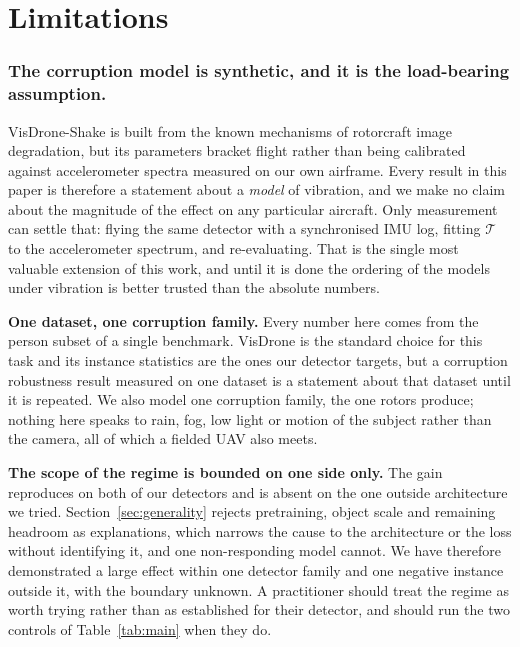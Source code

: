 \section{Limitations}
\label{sec:limitations}

\subsubsection{The corruption model is synthetic, and it is the load-bearing assumption.}
VisDrone-Shake is built from the known mechanisms of rotorcraft image degradation,
but its parameters bracket flight rather than being calibrated against accelerometer
spectra measured on our own airframe. Every result in this paper is therefore a
statement about a \emph{model} of vibration, and we make no claim about the
magnitude of the effect on any particular aircraft. Only measurement can settle
that: flying the same detector with a synchronised IMU log, fitting $\mathcal{T}$
to the accelerometer spectrum, and re-evaluating. That is the single most valuable
extension of this work, and until it is done the ordering of the models under
vibration is better trusted than the absolute numbers.

\medskip\noindent\textbf{One dataset, one corruption family.}
Every number here comes from the person subset of a single benchmark. VisDrone is
the standard choice for this task and its instance statistics are the ones our
detector targets, but a corruption robustness result measured on one dataset is a
statement about that dataset until it is repeated. We also model one corruption
family, the one rotors produce; nothing here speaks to rain, fog, low light or
motion of the subject rather than the camera, all of which a fielded UAV also meets.

\medskip\noindent\textbf{The scope of the regime is bounded on one side only.}
The gain reproduces on both of our detectors and is absent on the one outside
architecture we tried. Section~\ref{sec:generality} rejects pretraining, object
scale and remaining headroom as explanations, which narrows the cause to the
architecture or the loss without identifying it, and one non-responding model
cannot. We have therefore demonstrated a large effect within one detector family
and one negative instance outside it, with the boundary unknown. A practitioner
should treat the regime as worth trying rather than as established for their
detector, and should run the two controls of Table~\ref{tab:main} when they do.

